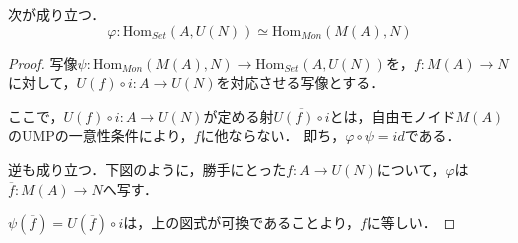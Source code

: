 \documentclass[uplatex, dvipdfmx]{jsarticle}
\begin{document}
\begin{proposition*}
    次が成り立つ．
    \[ \varphi:\mathrm{Hom}_{Set}(A,U(N))\simeq\mathrm{Hom}_{Mon}(M(A),N) \]
\end{proposition*}
\begin{proof}
    写像$\psi:\mathrm{Hom}_{Mon}(M(A),N)\to\mathrm{Hom}_{Set}(A,U(N))$を，$f:M(A)\to N$に対して，$U(f)\circ i:A\to U(N)$を対応させる写像とする．
    \begin{center}
    \end{center}
    ここで，$U(f)\circ i:A\to U(N)$が定める射$\overline{U(f)\circ i}$とは，自由モノイド$M(A)$のUMPの一意性条件により，$f$に他ならない．
    即ち，$\varphi\circ\psi=id$である．
    
    逆も成り立つ．下図のように，勝手にとった$f:A\to U(N)$について，$\varphi$は$\overline{f}:M(A)\to N$へ写す．
    \begin{center}
    \end{center}
    $\psi(\overline{f})=U(\overline{f})\circ i$は，上の図式が可換であることより，$f$に等しい．
\end{proof}
\end{document}
